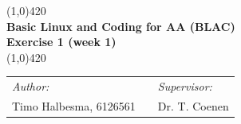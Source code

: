 \documentclass[a4paper]{article}
\begin{document}
\begin{center}
\line(1,0){420} \\
\huge \textbf{Basic Linux and Coding for AA (BLAC) \\ Exercise 1 (week 1)} \\
\line(1,0){420}
\end{center}

\vfill



\begin{table}[h]
\begin{center}
\begin{tabular}{lp{5cm}l}
\textit{Author:} & & \emph{Supervisor:} \\
Timo Halbesma, 6126561 & & Dr. T. Coenen\\
\end{tabular}
\end{center}
\end{table}


\newpage


\end{document}
